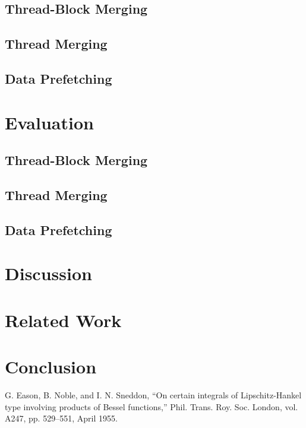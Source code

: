 \documentclass[conference]{IEEEtran}
\begin{document}
\subsection{Thread-Block Merging}


\subsection{Thread Merging}


\subsection{Data Prefetching}

\section{Evaluation}

\subsection{Thread-Block Merging}

\subsection{Thread Merging}

\subsection{Data Prefetching}

\section{Discussion}

\section{Related Work}

\section{Conclusion}

\begin{thebibliography}{00}
 G. Eason, B. Noble, and I. N. Sneddon, ``On certain integrals of Lipschitz-Hankel type involving products of Bessel functions,'' Phil. Trans. Roy. Soc. London, vol. A247, pp. 529--551, April 1955.

\end{thebibliography}
\end{document}
